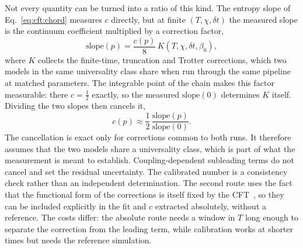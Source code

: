 Not every quantity can be turned into a ratio of this kind. The entropy slope of Eq.~\eqref{eq:cft:chord} measures $c$ directly, but at finite $(T,\chi,\delta t)$ the measured slope is the continuum coefficient multiplied by a correction factor,
\begin{equation}
  \mathrm{slope}(p) = \frac{c(p)}{8}\,K(T,\chi,\delta t,\beta_0),
  \label{eq:cft:calib}
\end{equation}
where $K$ collects the finite-time, truncation and Trotter corrections, which two models in the same universality class share when run through the same pipeline at matched parameters. The integrable point of the chain makes this factor measurable: there $c=\tfrac12$ exactly, so the measured $\mathrm{slope}(0)$ determines $K$ itself. Dividing the two slopes then cancels it,
\begin{equation}
  c(p) \approx \frac{1}{2}\,\frac{\mathrm{slope}(p)}{\mathrm{slope}(0)}.
  \label{eq:cft:calibratio}
\end{equation} The cancellation is exact only for corrections common to both runs. It therefore assumes that the two models share a universality class, which is part of what the measurement is meant to establish. Coupling-dependent subleading terms do not cancel and set the residual uncertainty. The calibrated number is a consistency check rather than an independent determination. The second route uses the fact that the functional form of the corrections is itself fixed by the \ac{CFT}~\cite{boucomas2026}, so they can be included explicitly in the fit and $c$ extracted absolutely, without a reference. The costs differ: the absolute route needs a window in $T$ long enough to separate the correction from the leading term, while calibration works at shorter times but needs the reference simulation.